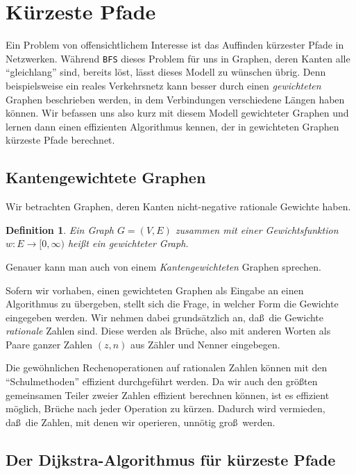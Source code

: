 \documentclass[10pt,reqno]{amsart}
\numberwithin{equation}{section}
\newtheorem{definition}{Definition}[section]
\begin{document}
\section{K\"urzeste Pfade}\label{sec_shortest_path}

\noindent
Ein Problem von offensichtlichem Interesse ist das Auffinden k\"urzester Pfade in Netzwerken.
W\"ahrend {\tt BFS} dieses Problem f\"ur uns in Graphen, deren Kanten alle ``gleichlang'' sind, bereits l\"ost, l\"asst dieses Modell zu w\"unschen \"ubrig.
Denn beispielsweise ein reales Verkehrsnetz kann besser durch einen {\em gewichteten} Graphen beschrieben werden, in dem Verbindungen verschiedene L\"angen haben k\"onnen.
Wir befassen uns also kurz mit diesem Modell gewichteter Graphen und lernen dann einen effizienten Algorithmus kennen, der in gewichteten Graphen k\"urzeste Pfade berechnet.

\subsection{Kantengewichtete Graphen}\label{sec_weighted}
Wir betrachten Graphen, deren Kanten nicht-negative rationale Gewichte haben.

\begin{definition}\label{deg_weighted}
	Ein Graph $G=(V,E)$ zusammen mit einer Gewichtsfunktion $w:E\to[0,\infty)$ hei\ss t ein {\em gewichteter Graph}.
\end{definition}

\noindent
Genauer kann man auch von einem {\em Kantengewichteten} Graphen sprechen.

Sofern wir vorhaben, einen gewichteten Graphen als Eingabe an einen Algorithmus zu \"ubergeben, stellt sich die Frage, in welcher Form die Gewichte eingegeben werden.
Wir nehmen dabei grunds\"atzlich an, da\ss\ die Gewichte {\em rationale} Zahlen sind.
Diese werden als Br\"uche, also mit anderen Worten als Paare ganzer Zahlen $(z,n)$ aus Z\"ahler und Nenner eingebegen.

Die gew\"ohnlichen Rechenoperationen auf rationalen Zahlen k\"onnen mit den ``Schulmethoden'' effizient durchgef\"uhrt werden.
Da wir auch den gr\"o\ss ten gemeinsamen Teiler zweier Zahlen effizient berechnen k\"onnen, ist es effizient m\"oglich, Br\"uche nach jeder Operation zu k\"urzen.
Dadurch wird vermieden, da\ss\ die Zahlen, mit denen wir operieren, unn\"otig gro\ss\ werden.

\subsection{Der Dijkstra-Algorithmus f\"ur k\"urzeste Pfade}\label{sec_dijkstra}
\end{document}
